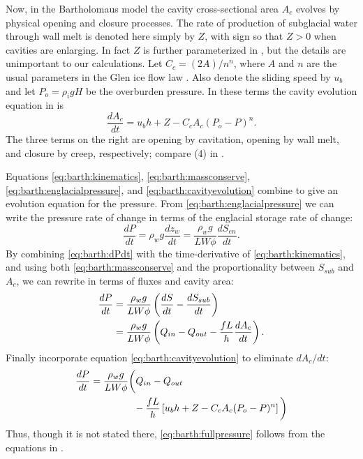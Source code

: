 \documentclass[review,letterpaper]{igs}
\begin{document}
Now, in the Bartholomaus model the cavity cross-sectional area $A_c$ evolves by physical opening and closure processes.  The rate of production of subglacial water through wall melt is denoted here simply by $Z$, with sign so that $Z>0$ when cavities are enlarging.  In fact $Z$ is further parameterized in \cite{Bartholomausetal2011}, but the details are unimportant to our calculations.  Let $C_c = (2 A)/n^n$, where $A$ and $n$ are the usual parameters in the Glen ice flow law \citep{CuffeyPaterson}.  Also denote the sliding speed by $u_b$ and let $P_o=\rho_i g H$ be the overburden pressure.  In these terms the cavity evolution equation in \cite{Bartholomausetal2011} is
\begin{equation}
\frac{dA_c}{dt} = u_b h + Z - C_c A_c (P_o-P)^n.  \label{eq:barth:cavityevolution}
\end{equation}
The three terms on the right are opening by cavitation, opening by wall melt, and closure by creep, respectively; compare (4) in \cite{Bartholomausetal2011}.

Equations \eqref{eq:barth:kinematics}, \eqref{eq:barth:massconserve}, \eqref{eq:barth:englacialpressure}, and \eqref{eq:barth:cavityevolution} combine to give an evolution equation for the pressure.  From \eqref{eq:barth:englacialpressure} we can write the pressure rate of change in terms of the englacial storage rate of change:
\begin{equation}
\frac{dP}{dt} = \rho_w g \frac{dz_w}{dt} = \frac{\rho_w g}{L W \phi} \frac{d S_{en}}{dt}. \label{eq:barth:dPdt}
\end{equation}
By combining \eqref{eq:barth:dPdt} with  the time-derivative of \eqref{eq:barth:kinematics}, and using both \eqref{eq:barth:massconserve} and the proportionality between $S_{sub}$ and $A_c$, we can rewrite in terms of fluxes and cavity area:
\begin{align}
\frac{dP}{dt} &= \frac{\rho_w g}{L W \phi} \left(\frac{d S}{dt} - \frac{d S_{sub}}{dt}\right) \\
&= \frac{\rho_w g}{L W \phi} \left(Q_{in} - Q_{out} - \frac{f L }{h} \frac{d A_c}{dt}\right). \notag
\end{align}
Finally incorporate equation \eqref{eq:barth:cavityevolution} to eliminate $dA_c/dt$:
\begin{align}
&\frac{dP}{dt} = \frac{\rho_w g}{L W \phi} \bigg(Q_{in} - Q_{out} \label{eq:barth:fullpressure} \\
&\qquad \qquad \qquad - \frac{f L }{h} \left[u_b h + Z - C_c A_c (P_o-P)^n\right]\bigg) \notag
\end{align}
Thus, though it is not stated there, \eqref{eq:barth:fullpressure} follows from the equations in \cite{Bartholomausetal2011}.
\end{document}
